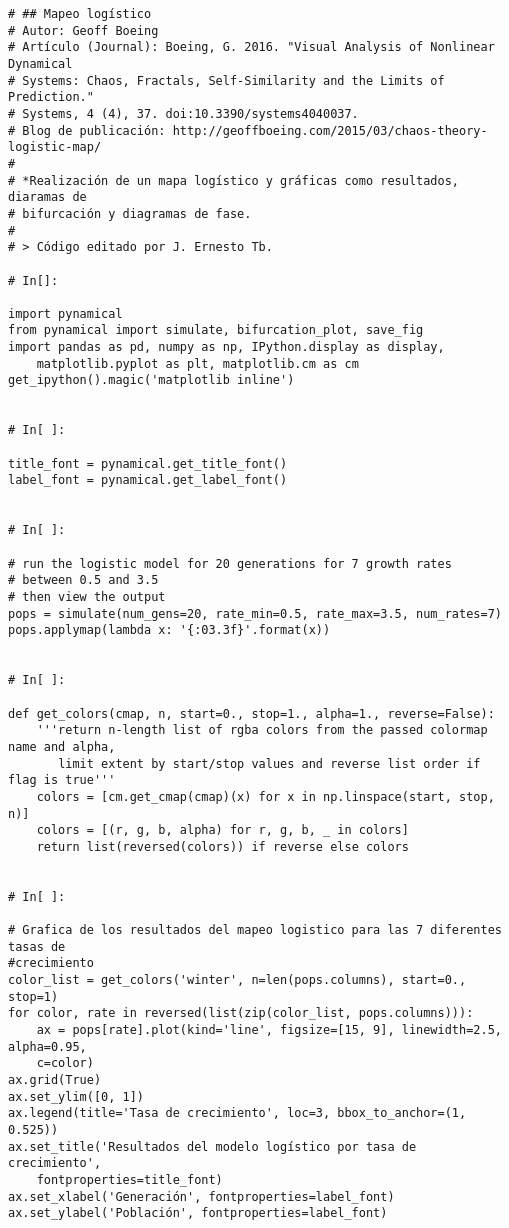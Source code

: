 \begin{verbatim}
# ## Mapeo logístico
# Autor: Geoff Boeing
# Artículo (Journal): Boeing, G. 2016. "Visual Analysis of Nonlinear Dynamical 
# Systems: Chaos, Fractals, Self-Similarity and the Limits of Prediction." 
# Systems, 4 (4), 37. doi:10.3390/systems4040037.
# Blog de publicación: http://geoffboeing.com/2015/03/chaos-theory-logistic-map/
# 
# *Realización de un mapa logístico y gráficas como resultados, diaramas de 
# bifurcación y diagramas de fase.
# 
# > Código editado por J. Ernesto Tb.

# In[]:

import pynamical
from pynamical import simulate, bifurcation_plot, save_fig
import pandas as pd, numpy as np, IPython.display as display, 
	matplotlib.pyplot as plt, matplotlib.cm as cm
get_ipython().magic('matplotlib inline')


# In[ ]:

title_font = pynamical.get_title_font()
label_font = pynamical.get_label_font()


# In[ ]:

# run the logistic model for 20 generations for 7 growth rates 
# between 0.5 and 3.5 
# then view the output
pops = simulate(num_gens=20, rate_min=0.5, rate_max=3.5, num_rates=7)
pops.applymap(lambda x: '{:03.3f}'.format(x))


# In[ ]:

def get_colors(cmap, n, start=0., stop=1., alpha=1., reverse=False):
    '''return n-length list of rgba colors from the passed colormap name and alpha,
       limit extent by start/stop values and reverse list order if flag is true'''
    colors = [cm.get_cmap(cmap)(x) for x in np.linspace(start, stop, n)]
    colors = [(r, g, b, alpha) for r, g, b, _ in colors]
    return list(reversed(colors)) if reverse else colors


# In[ ]:

# Grafica de los resultados del mapeo logistico para las 7 diferentes tasas de 
#crecimiento
color_list = get_colors('winter', n=len(pops.columns), start=0., stop=1)
for color, rate in reversed(list(zip(color_list, pops.columns))):
	ax = pops[rate].plot(kind='line', figsize=[15, 9], linewidth=2.5, alpha=0.95,
    c=color)
ax.grid(True)
ax.set_ylim([0, 1])
ax.legend(title='Tasa de crecimiento', loc=3, bbox_to_anchor=(1, 0.525))
ax.set_title('Resultados del modelo logístico por tasa de crecimiento', 
	fontproperties=title_font)
ax.set_xlabel('Generación', fontproperties=label_font)
ax.set_ylabel('Población', fontproperties=label_font)


\end{verbatim}
